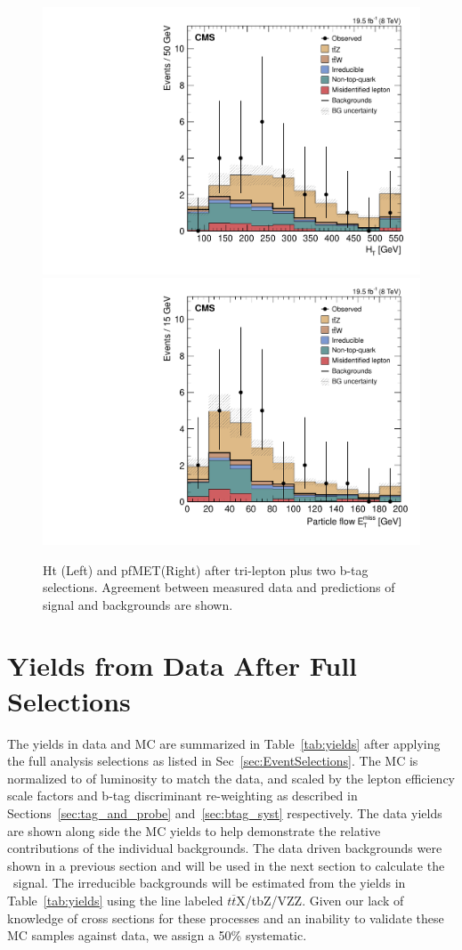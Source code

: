 \begin{figure}[h]
\begin{center}
\includegraphics[width=0.48\linewidth]{Figs/Plots_PreSelections/hHt_3L2b.pdf}
\includegraphics[width=0.48\linewidth]{Figs/Plots_PreSelections/hPFMet_3L2b.pdf}
\caption{\label{fig:hht_pfmet_3l}
Ht (Left) and pfMET(Right) after tri-lepton plus two b-tag selections. Agreement between measured data and predictions of signal and backgrounds are shown.
}
\end{center}
\end{figure}







         
	\section{Yields from Data After Full Selections}
	The yields in data and MC are summarized in Table~\ref{tab:yields} after applying the full analysis selections as listed in Sec~\ref{sec:EventSelections}. The MC is normalized to \intLumi of luminosity to match the data, and scaled by the lepton efficiency scale factors and b-tag discriminant re-weighting as described in Sections~\ref{sec:tag_and_probe} and~\ref{sec:btag_syst} respectively. The data yields are shown along side the MC yields to help demonstrate the relative contributions of the individual backgrounds. The data driven backgrounds were shown in a previous section and will be used in the next section to calculate the \ttZ \ signal. The irreducible backgrounds will be estimated from the yields in Table~\ref{tab:yields} using the line labeled $t\overline{t}$X/tbZ/VZZ. Given our lack of knowledge of cross sections for these processes and an inability to validate these MC samples against data, we assign a 50\% systematic.

